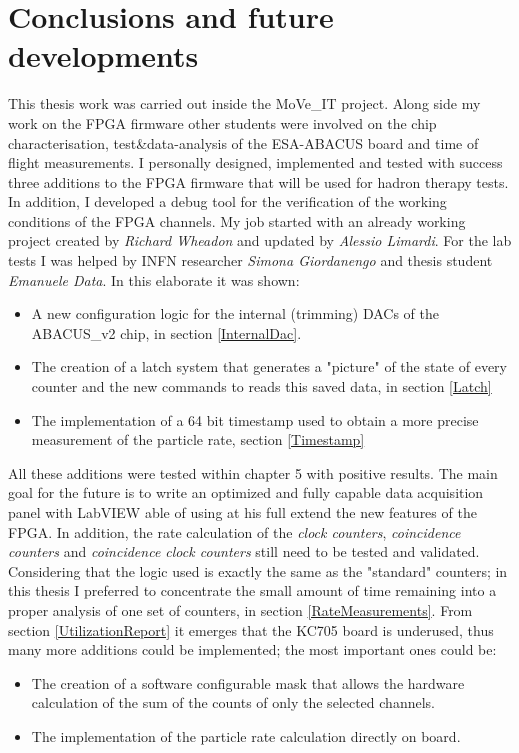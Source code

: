 \chapter*{Conclusions and future developments}
\noindent This thesis work was carried out inside the MoVe\_IT project.
Along side my work on the FPGA firmware other students were involved on the chip characterisation, test\&data-analysis of the ESA-ABACUS board and time of flight measurements.
I personally designed, implemented and tested with success three additions to the FPGA firmware that will be used for hadron therapy tests.
In addition, I developed a debug tool for the verification of the working conditions of the FPGA channels.
My job started with an already working project created by \textit{Richard Wheadon} and updated by \textit{Alessio Limardi}.
For the lab tests I was helped by INFN researcher \textit{Simona Giordanengo} and thesis student \textit{Emanuele Data}.
In this elaborate it was shown:
\begin{itemize}
	\item A new configuration logic for the internal (trimming) DACs of the ABACUS\_v2 chip, in section \ref{InternalDac}.
	\item The creation of a latch system that generates a "picture" of the state of every counter and the new commands to reads this saved data, in section \ref{Latch}
	\item The implementation of a 64 bit timestamp used to obtain a more precise measurement of the particle rate, section \ref{Timestamp}
\end{itemize}
\noindent All these additions were tested within chapter 5 with positive results.
The main goal for the future is to write an optimized and fully capable data acquisition panel with LabVIEW able of using at his full extend the new features of the FPGA.
In addition, the rate calculation of the \textit{clock counters}, \textit{coincidence counters} and \textit{coincidence clock counters} still need to be tested and validated. Considering that the logic used is exactly the same as the "standard" counters; in this thesis I preferred to concentrate the small amount of time remaining into a proper analysis of one set of counters, in section \ref{RateMeasurements}.
From section \ref{UtilizationReport} it emerges that the KC705 board is underused, thus many more additions could be implemented; the most important ones could be:
\begin{itemize}
	\item The creation of a software configurable mask that allows the hardware calculation of the sum of the counts of only the selected channels.  
	\item The implementation of the particle rate calculation directly on board.
\end{itemize}


